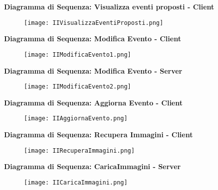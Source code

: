 \textbf{Diagramma di Sequenza: Visualizza eventi proposti - Client}\\
\begin{figure}[h!]
    \begin{center}
        \texttt{[image: IIVisualizzaEventiProposti.png]}
    \end{center}
\end{figure}
\clearpage
\textbf{Diagramma di Sequenza: Modifica Evento - Client}\\
\begin{figure}[h!]
    \begin{center}
        \texttt{[image: IIModificaEvento1.png]}
    \end{center}
\end{figure}

\textbf{Diagramma di Sequenza: Modifica Evento - Server}\\

\begin{figure}[h!]
    \begin{center}
        \texttt{[image: IIModificaEvento2.png]}
    \end{center}
\end{figure}
\clearpage
\textbf{Diagramma di Sequenza: Aggiorna Evento - Client}\\
\begin{figure}[h!]
    \begin{center}
        \texttt{[image: IIAggiornaEvento.png]}
    \end{center}
\end{figure}

\textbf{Diagramma di Sequenza: Recupera Immagini - Client}\\
\begin{figure}[h!]
    \begin{center}
        \texttt{[image: IIRecuperaImmagini.png]}
    \end{center}
\end{figure}
\clearpage                                                                      
\textbf{Diagramma di Sequenza: CaricaImmagini - Server}\\
\begin{figure}[h!]
    \begin{center}
        \texttt{[image: IICaricaImmagini.png]}
    \end{center}
\end{figure}
\clearpage

